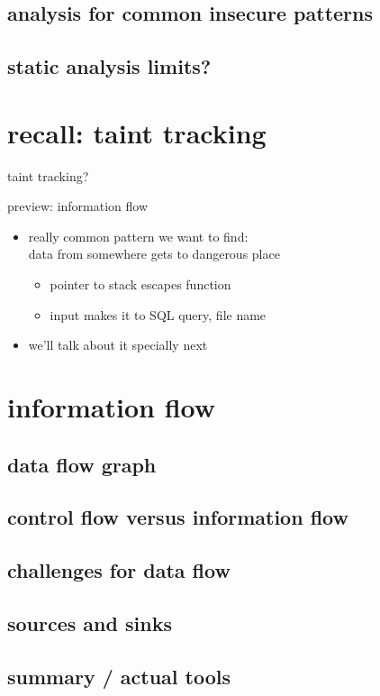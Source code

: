 \subsection{analysis for common insecure patterns}


\subsection{static analysis limits?}


\section{recall: taint tracking}
\begin{frame}{taint tracking?}
\end{frame}

\begin{frame}{preview: information flow}
    \begin{itemize}
    \item really common pattern we want to find: \\
        data from somewhere gets to dangerous place
        \begin{itemize}
        \item pointer to stack escapes function
        \item input makes it to SQL query, file name
        \end{itemize}
    \item we'll talk about it specially next
    \end{itemize}
\end{frame}

\section{information flow}


\subsection{data flow graph}


\subsection{control flow versus information flow} 


\subsection{challenges for data flow}


\subsection{sources and sinks}



\subsection{summary / actual tools}



